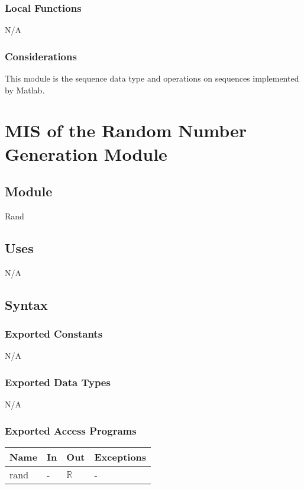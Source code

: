 \documentclass[12pt, titlepage]{article}
\begin{document}
\subsubsection{Local Functions}

N/A

\subsubsection{Considerations}
This module is the sequence data type and operations on sequences implemented 
by Matlab.


\section{MIS of the Random Number Generation Module} \label{sec:Random}

\subsection{Module}
Rand

\subsection{Uses}

N/A

\subsection{Syntax}

\subsubsection{Exported Constants}
N/A

\subsubsection{Exported Data Types}

N/A

\subsubsection{Exported Access Programs}

\begin{center}
	\renewcommand*{\arraystretch}{1.5}
	\begin{tabular} {p{}  p{}  p{} 
			p{} } \hline 
		\textbf{Name} & \textbf{In} & \textbf{Out} & \textbf{Exceptions} \\ 
		\hline
		
		rand & - & $\mathbb{R}$ & - \\ \hline
	\end{tabular}
\end{center}
\end{document}
